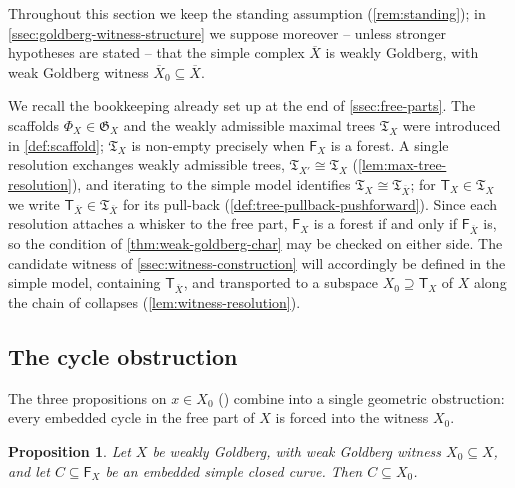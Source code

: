 \documentclass[reqno]{amsart}
\newtheorem{proposition}[theorem]{Proposition}
\theoremstyle{definition}
\newcommand\sfT{\mathsf{T}}
\renewcommand{\bar}{\overline}
\numberwithin{equation}{section}
\begin{document}
Throughout this section we keep the standing assumption
(\cref{rem:standing}); in
\cref{ssec:goldberg-witness-structure} we suppose moreover --
unless stronger hypotheses are stated -- that the simple complex
\(\bar X\) is weakly Goldberg, with weak Goldberg witness
\(\bar X_0\subseteq\bar X\).

We recall the bookkeeping already set up at the end of
\cref{ssec:free-parts}. The scaffolds
\(\Phi_X\in\mathfrak{G}_X\) and the weakly admissible maximal trees
\(\mathfrak{T}_X\) were introduced in \cref{def:scaffold};
\(\mathfrak{T}_X\) is non-empty precisely when \(\mathsf{F}_X\)
is a forest. A single resolution exchanges weakly admissible trees,
\(\mathfrak{T}_{X'}\cong\mathfrak{T}_X\)
(\cref{lem:max-tree-resolution}), and iterating to the simple
model identifies \(\mathfrak{T}_X\cong\mathfrak{T}_{\bar X}\);
for \(\sfT_X\in\mathfrak{T}_X\) we write
\(\sfT_{\bar X}\in\mathfrak{T}_{\bar X}\) for its pull-back
(\cref{def:tree-pullback-pushforward}). Since each resolution
attaches a whisker to the free part, \(\mathsf{F}_X\) is a
forest if and only if \(\mathsf{F}_{\bar X}\) is, so the
condition of \cref{thm:weak-goldberg-char} may be checked on
either side. The candidate witness of
\cref{ssec:witness-construction} will accordingly be defined in
the simple model, containing \(\sfT_{\bar X}\), and transported to
a subspace \(X_0\supseteq \sfT_X\) of \(X\) along the chain of
collapses (\cref{lem:witness-resolution}).

\subsection{The cycle obstruction}
\label{ssec:cycle-obstruction}

The three propositions on \(x\in X_0\)
()
combine into a single geometric obstruction: every embedded cycle in
the free part of \(X\) is forced into the witness \(X_0\).

\begin{proposition}\label{cor:cycle-in-X0}
Let \(X\) be weakly Goldberg, with weak Goldberg witness
\(X_0\subseteq X\), and let \(C\subseteq\mathsf{F}_X\) be an
embedded simple closed curve. Then \(C\subseteq X_0\).
\end{proposition}
\end{document}
